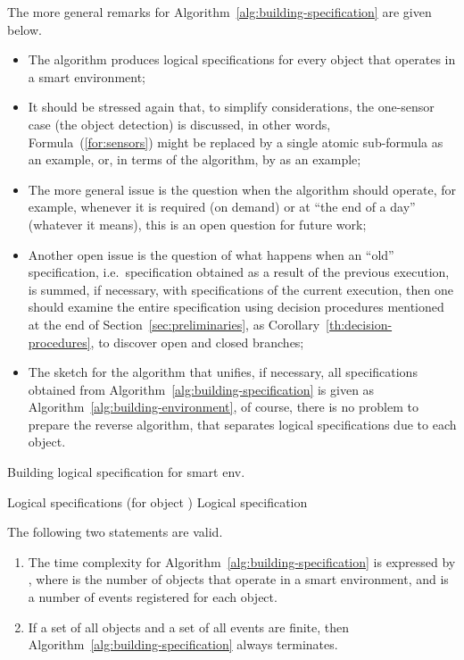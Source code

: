 \documentclass[runningheads,a4paper]{llncs}
\begin{document}
The more general remarks for Algorithm~\ref{alg:building-specification}
are given below.
\begin{itemize}
  \item The algorithm produces logical specifications  for every object that operates in a smart environment;
  \item It should be stressed again that,
        to simplify considerations, the one-sensor case (the object detection) is discussed,
        in other words, Formula~(\ref{for:sensors}) might be replaced by a single atomic sub-formula  as an example,
        or, in terms of the algorithm, by  as an example;
  \item The more general issue is the question when the algorithm should operate,
        for example, whenever it is required (on demand) or at ``the end of a day'' (whatever it means),
        this is an open question for future work;
  \item Another open issue is the question of what happens when an ``old'' specification,
        i.e.\ specification obtained as a result of the previous execution, is
        summed, if necessary, with specifications of the current execution,
        then one should examine the entire specification using decision procedures
        mentioned at the end of Section~\ref{sec:preliminaries},
        as Corollary~\ref{th:decision-procedures},
        to discover open and closed branches;
  \item The sketch for the algorithm that unifies, if necessary,
        all specifications obtained from Algorithm~\ref{alg:building-specification}
        is given as Algorithm~\ref{alg:building-environment},
        of course,
        there is no problem to prepare the reverse algorithm,
        that separates logical specifications due to each object.
\end{itemize}
\begin{algorithm}[htb]
\caption{Building logical specification for smart env.\ }
\label{alg:building-environment}
{\normalsize
\begin{algorithmic}[1]
\algrenewcommand{}
\algrenewcommand{}
\Require Logical specifications  (for object )
\Ensure Logical specification 
\For{}
\EndFor
\EndFor
\State{}
\end{algorithmic}
}
\end{algorithm}
\begin{corollary}
\label{cor:algorithm-1}
The following two statements are valid.
\begin{enumerate}
  \item
The time complexity for Algorithm~\ref{alg:building-specification} is expressed by
,
where  is the number of objects that operate in a smart environment,
and  is a number of events registered for each object.
  \item
If a set of all objects and a set of all events are finite,
then Algorithm~\ref{alg:building-specification} always terminates.
\end{enumerate}
\end{corollary}
\end{document}
